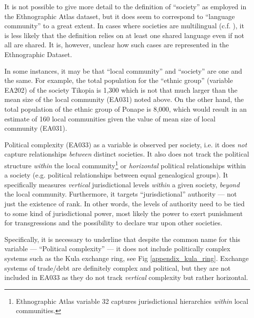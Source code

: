 \documentclass[unnumsec,webpdf,modern,medium]{oup-authoring-template}
\begin{document}
It is not possible to give more detail to the definition of ``society'' as employed in the Ethnographic Atlas dataset, but it does seem to correspond to ``language community'' to a great extent. In cases where societies are multilingual (c.f. \citet{evans2017did}), it is less likely that the definition relies on at least one shared language even if not all are shared. It is, however, unclear how such cases are represented in the Ethnographic Dataset.

In some instances, it may be that ``local community'' and ``society'' are one and the same. For example, the total population for the ``ethnic group'' (variable EA202) of the society Tikopia is 1,300 which is not that much larger than the mean size of the local community (EA031) noted above. On the other hand, the total population of the ethnic group of Ponape is 8,000, which would result in an estimate of 160 local communities given the value of mean size of local community (EA031).
  
Political complexity (EA033) as a variable is observed per society, i.e. it does \emph{not} capture relationships \emph{between} distinct societies. It also does not track the political structure \emph{within} the local community\footnote{Ethnographic Atlas variable 32 captures jurisdictional hierarchies \emph{within} local communities.} or \emph{horizontal} political relationships within a society (e.g. political relationships between equal genealogical groups). It specifically measures \emph{vertical} jurisdictional levels \emph{within} a given society, \emph{beyond} the local community. Furthermore, it targets ``jurisdictional'' authority --- not just the existence of rank. In other words, the levels of authority need to be tied to some kind of jurisdictional power, most likely the power to exert punishment for transgressions and the possibility to declare war upon other societies. 

Specifically, it is necessary to underline that despite the common name for this variable --- ``Political complexity'' --- it does not include politically complex systems such as the Kula exchange ring\citet{damon2002kula}, see Fig \ref{appendix_kula_ring}. Exchange systems of trade/debt are definitely complex and political, but they are not included in EA033 as they do not track \emph{vertical} complexity but rather horizontal.
\end{document}

